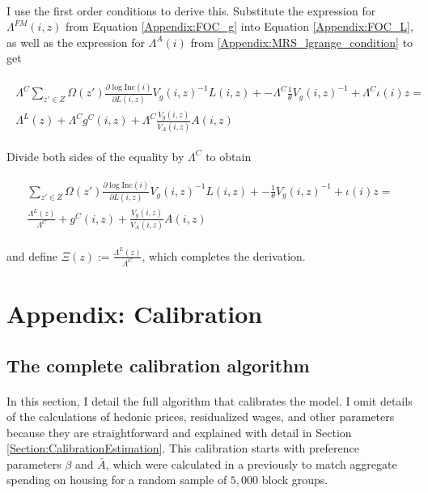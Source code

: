 \documentclass[12pt]{article}
\begin{document}
	\paragraph*{}
	I use the first order conditions to derive this. Substitute the expression for $\Lambda^{FM}(i, z)$ from Equation \eqref{Appendix:FOC_g} into Equation \eqref{Appendix:FOC_L}, as well as the expression for $\Lambda^{A}(i)$ from \eqref{Appendix:MRS_lgrange_condition} to get
	
	\begin{align}
		\begin{split}
			\Lambda^{C}\sum_{z' \in Z}\Omega(z')\frac{\partial \log \text{Inc}(i)}{\partial L(i, z)}V_{g}(i, z)^{-1}L(i, z) + -\Lambda^{C}\frac{1}{\theta}V_{g}(i, z)^{-1} + \Lambda^{C}\iota(i)z  = \\ \Lambda^{L}(z) + \Lambda^{C}g^{C}(i, z) + \Lambda^{C}\frac{V_{g}(i, z)}{V_{A}(i, z)}A(i, z)
		\end{split}
	\end{align}
	
	Divide both sides of the equality by $\Lambda^{C}$ to obtain
	
	\begin{align}
		\begin{split}
		\sum_{z' \in Z}\Omega(z')\frac{\partial \log \text{Inc}(i)}{\partial L(i, z)}V_{g}(i, z)^{-1}L(i, z) + -\frac{1}{\theta}V_{g}(i, z)^{-1} + \iota(i)z  = \\ 
		\frac{\Lambda^{L}(z)}{\Lambda^{C}} + g^{C}(i, z) + \frac{V_{g}(i, z)}{V_{A}(i, z)}A(i, z)
		\end{split}
	\end{align}
	
	and define $\Xi(z) := \frac{\Lambda^{L}(z)}{\Lambda^{C}}$, which completes the derivation.
	
	\clearpage
	
	
	\section{Appendix: Calibration}\label{Appendix:Calibration}	
	
	\subsection{The complete calibration algorithm}
	\paragraph*{}
	In this section, I detail the full algorithm that calibrates the model. I omit details of the calculations of hedonic prices, residualized wages, and other parameters because they are straightforward and explained with detail in Section \ref{Section:CalibrationEstimation}. This calibration starts with preference parameters $\beta$ and $\bar{A}$, which were calculated in a previously to match aggregate spending on housing for a random sample of $5,000$ block groups.  
	
\end{document}
